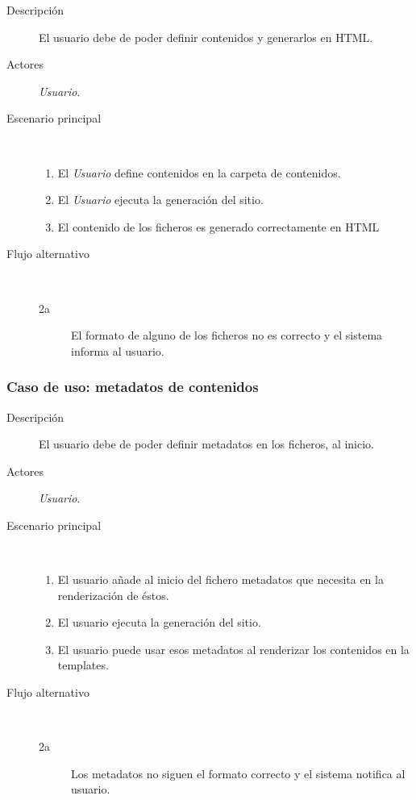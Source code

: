 \begin{description}
    \item[Descripción] El usuario debe de poder definir contenidos y generarlos en HTML.
    \item[Actores] \textit{Usuario}.
    \item[Escenario principal] $\quad$
        \begin{enumerate}
            \item El \textit{Usuario} define contenidos en la carpeta de contenidos.
            \item El \textit{Usuario} ejecuta la generación del sitio.
            \item El contenido de los ficheros es generado correctamente en HTML
        \end{enumerate}
    \item[Flujo alternativo] $\quad$
        \begin{description}
            \item[2a] El formato de alguno de los ficheros no es correcto y el sistema informa al usuario.
        \end{description}
\end{description}

\subsubsection{Caso de uso: metadatos de contenidos}

\begin{description}
    \item[Descripción] El usuario debe de poder definir metadatos en los ficheros, al inicio.
    \item[Actores] \textit{Usuario}.
    \item[Escenario principal] $\quad$
        \begin{enumerate}
            \item El usuario añade al inicio del fichero metadatos que necesita en la renderización de éstos.
            \item El usuario ejecuta la generación del sitio.
            \item El usuario puede usar esos metadatos al renderizar los contenidos en la templates.
        \end{enumerate}
    \item[Flujo alternativo] $\quad$
        \begin{description}
            \item[2a] Los metadatos no siguen el formato correcto y el sistema notifica al usuario.
        \end{description}
\end{description}

